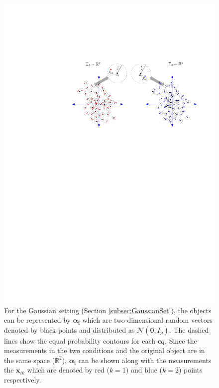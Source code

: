 \documentclass[12pt]{article} %
\begin{document}
    \begin{figure}
	\begin{center}
    \includegraphics[scale=0.55]{MVN_alpha_r_multiple_sancar.pdf}
    \caption{For the  Gaussian setting (Section \ref{subsec:GaussianSet}), the objects can be represented by $\bm{\alpha_i}$  which are two-dimensional random vectors denoted by black points and distributed as $\mathcal{N}(\bm{0},I_p)$. The dashed lines show the equal probability contours for each  $\bm{\alpha_i}$. Since  the measurements in the two conditions and the original object   are in the same space ($\mathbb{R}^2$), $\bm{\alpha_i}$ can be shown along with the measurements the $\bm{x}_{ik}$ which are denoted by red ($k=1$) and blue ($k=2$) points respectively.}
\label{fig:Fig1}
	\end{center}
  \end{figure}
\end{document}
